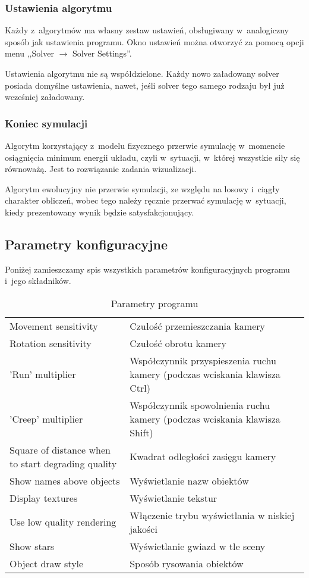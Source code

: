 \documentclass[a4paper,onecolumn,oneside,12pt]{mwart}
\begin{document}
\subsubsection{Ustawienia algorytmu}

Każdy z~algorytmów ma własny zestaw ustawień, obsługiwany w~analogiczny
sposób jak ustawienia programu. Okno ustawień można otworzyć za pomocą
opcji menu ,,Solver $\rightarrow$ Solver Settings''.

Ustawienia algorytmu nie są współdzielone. Każdy nowo załadowany solver
posiada domyślne ustawienia, nawet, jeśli solver tego samego rodzaju był
już wcześniej załadowany.

\subsubsection{Koniec symulacji}

Algorytm korzystający z~modelu fizycznego przerwie symulację w~momencie
osiągnięcia minimum energii układu, czyli w~sytuacji, w~której wszystkie
siły się równoważą. Jest to rozwiązanie zadania wizualizacji.

Algorytm ewolucyjny nie przerwie symulacji, ze względu na losowy i~ciągły
charakter obliczeń, wobec tego należy ręcznie przerwać symulację
w~sytuacji, kiedy prezentowany wynik będzie satysfakcjonujący.

\subsection{Parametry konfiguracyjne}

Poniżej zamieszczamy spis wszystkich parametrów konfiguracyjnych programu
i~jego składników.

\begin{table}[h!]
	\centering
	\begin{tabular}{p{}p{}}
		\hline
Movement sensitivity & Czułość przemieszczania kamery \\
Rotation sensitivity & Czułość obrotu kamery \\
'Run' multiplier & Współczynnik przyspieszenia ruchu kamery (podczas wciskania klawisza Ctrl) \\
'Creep' multiplier & Współczynnik spowolnienia ruchu kamery (podczas wciskania klawisza Shift) \\
Square of distance when to start degrading quality & Kwadrat odległości zasięgu kamery \\
Show names above objects & Wyświetlanie nazw obiektów \\
Display textures & Wyświetlanie tekstur \\
Use low quality rendering & Włączenie trybu wyświetlania w niskiej jakości \\
Show stars & Wyświetlanie gwiazd w tle sceny \\
Object draw style & Sposób rysowania obiektów \\
		\hline
	\end{tabular}
	\caption{Parametry programu}
	\label{tab:params-program}
\end{table}
\end{document}
